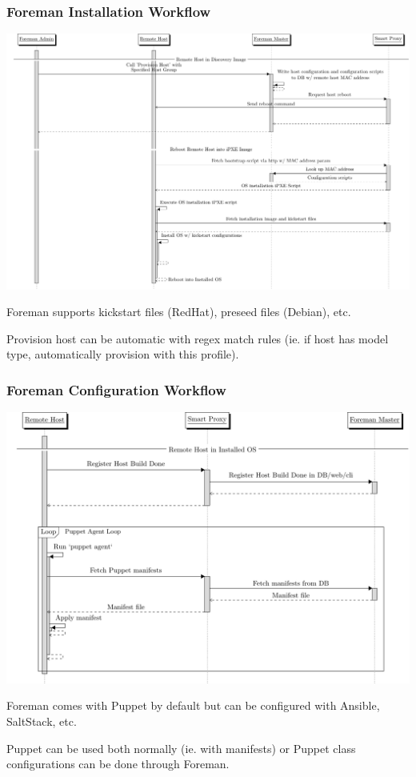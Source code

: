 \documentclass{beamer}
\begin{document}
\begin{frame}[fragile]
 \frametitle{Foreman Installation Workflow}

 \centering
 \includegraphics[width=\textwidth,height=\textheight-35mm,keepaspectratio]{installation_sd}

 \tiny Foreman supports kickstart files (RedHat), preseed files (Debian), etc.
 \vspace{.5cm}

 \normalsize Provision host can be automatic with regex match rules (ie. if host has model type, automatically provision with this profile).
\end{frame}

\begin{frame}[fragile]
 \frametitle{Foreman Configuration Workflow}

 \centering
 \includegraphics[width=\textwidth,height=\textheight-35mm,keepaspectratio]{configuration_sd}

 \tiny Foreman comes with Puppet by default but can be configured with Ansible, SaltStack, etc.
 \vspace{.5cm}

 \normalsize Puppet can be used both normally (ie. with manifests) or Puppet class configurations can be done through Foreman.
\end{frame}
\end{document}

